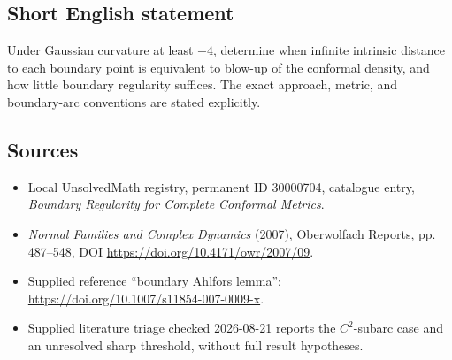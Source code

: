 \documentclass[11pt]{article}
\begin{document}
\subsection{Short English statement}
Under Gaussian curvature at least \(-4\), determine when infinite intrinsic distance to each boundary point is equivalent to blow-up of the conformal density, and how little boundary regularity suffices. The exact approach, metric, and boundary-arc conventions are stated explicitly.
\subsection{Sources}
\begin{itemize}
\item Local UnsolvedMath registry, permanent ID 30000704, catalogue entry, \emph{Boundary Regularity for Complete Conformal Metrics}.
\item \emph{Normal Families and Complex Dynamics} (2007), Oberwolfach Reports, pp. 487--548, DOI \url{https://doi.org/10.4171/owr/2007/09}.
\item Supplied reference ``boundary Ahlfors lemma'': \url{https://doi.org/10.1007/s11854-007-0009-x}.
\item Supplied literature triage checked 2026-08-21 reports the \(C^2\)-subarc case and an unresolved sharp threshold, without full result hypotheses.
\end{itemize}
\end{document}
